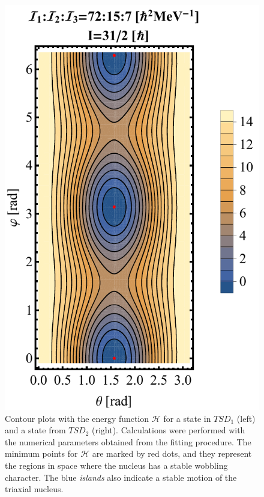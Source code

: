 \documentclass[11pt]{article}
\begin{document}
\begin{figure}
\begin{minipage}{.5\textwidth}
 \includegraphics[scale=0.5]{figs/contour-tsd2.pdf}
\end{minipage}
\caption{Contour plots with the energy function $\mathcal{H}$ for a state in $TSD_1$ (left) and a state from $TSD_2$ (right). Calculations were performed with the numerical parameters obtained from the fitting procedure. The minimum points for $\mathcal{H}$ are marked by red dots, and they represent the regions in space where the nucleus has a stable wobbling character. The blue \emph{islands} also indicate a stable motion of the triaxial nucleus.}
    \label{contours-12}
\end{figure}
\end{document}

